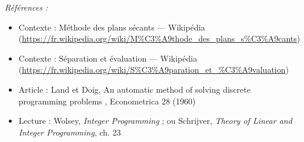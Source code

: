 \documentclass[11pt]{article}
\newenvironment{refs}{\par\small\noindent\emph{Références :}\begin{itemize}\setlength\itemsep{0pt}}{\end{itemize}\normalsize}
\begin{document}
\begin{refs}
\item Contexte : Méthode des plans sécants --- Wikipédia (\url{https://fr.wikipedia.org/wiki/M%C3%A9thode_des_plans_s%C3%A9cants})
\item Contexte : Séparation et évaluation --- Wikipédia (\url{https://fr.wikipedia.org/wiki/S%C3%A9paration_et_%C3%A9valuation})
\item Article : Land et Doig, \og{} An automatic method of solving discrete programming problems \fg{}, Econometrica 28 (1960)
\item Lecture : Wolsey, \textit{Integer Programming} ; ou Schrijver, \textit{Theory of Linear and Integer Programming}, ch. 23
\end{refs}

\bigskip
\end{document}
